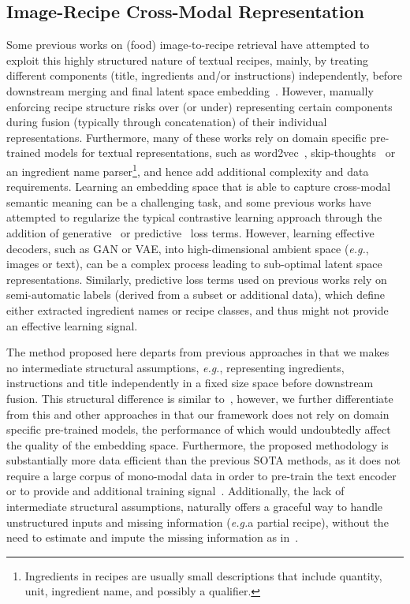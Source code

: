 \documentclass[sigconf,nonacm]{acmart}
\def\eg{\emph{e.g.}} \def\Eg{\emph{E.g.}}
\begin{document}
\subsection{Image-Recipe Cross-Modal Representation}
Some previous works on (food) image-to-recipe retrieval have attempted to exploit this highly structured nature of textual recipes, mainly, by treating different components (title, ingredients and/or instructions) independently, before downstream merging and final latent space embedding~\cite{salvador2017,carvalho2018,chen2018,Zhu2019,wang2020,wang2019,salvador2021,Fu2020,chef2021}. However, manually enforcing recipe structure risks over (or under) representing certain components during fusion (typically through concatenation) of their individual representations. Furthermore, many of these works rely on domain specific pre-trained models for textual representations, such as word2vec~\cite{mikolov2013}, skip-thoughts~\cite{kiros2015} or an ingredient name parser\footnote{Ingredients in recipes are usually small descriptions that include quantity, unit, ingredient name, and possibly a qualifier.}, and hence add additional complexity and data requirements. Learning an embedding space that is able to capture cross-modal semantic meaning can be a challenging task, and some previous works have attempted to regularize the typical contrastive learning approach through the addition of generative~\cite{wang2019,Zhu2019} or predictive~\cite{salvador2017,carvalho2018,Zhu2019,wang2019,wang2020} loss terms. However, learning effective decoders, such as GAN or VAE, into high-dimensional ambient space (\eg, images or text), can be a complex process leading to sub-optimal latent space representations. Similarly, predictive loss terms used on previous works rely on semi-automatic labels (derived from a subset or additional data), which define either extracted ingredient names or recipe classes, and thus might not provide an effective learning signal.


The method proposed here departs from previous approaches in that we makes no intermediate structural assumptions, \eg, representing ingredients, instructions and title independently in a fixed size space before downstream fusion. This structural difference is similar to~\cite{Fain2019}, however, we further differentiate from this and other approaches in that our framework does not rely on domain specific pre-trained models, the performance of which would undoubtedly affect the quality of the embedding space. Furthermore, the proposed methodology is substantially more data efficient than the previous SOTA methods, as it does not require a large corpus of mono-modal data in order to pre-train the text encoder~\cite{Fain2019} or to provide and additional training signal~\cite{salvador2021}. Additionally, the lack of intermediate structural assumptions, naturally offers a graceful way to handle unstructured inputs and missing information (\eg a partial recipe), without the need to estimate and impute the missing information as in~\cite{salvador2021}.
\end{document}
